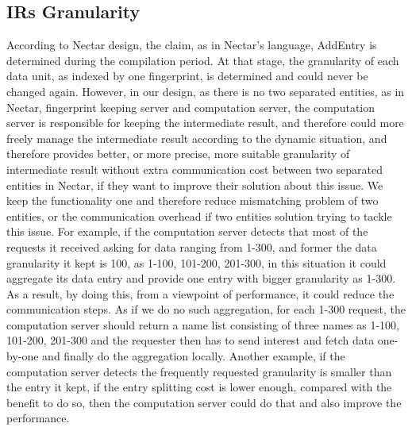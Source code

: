 \subsection{IRs Granularity}
According to Nectar design, the claim, as in Nectar’s language, AddEntry is determined during the compilation period. At that stage, the granularity of each data unit, as indexed by one fingerprint, is determined and could never be changed again. However, in our design, as there is no two separated entities, as in Nectar, fingerprint keeping server and computation server, the computation server is responsible for keeping the intermediate result, and therefore could more freely manage the intermediate result according to the dynamic situation, and therefore provides better, or more precise, more suitable granularity of intermediate result without extra communication cost between two separated entities in Nectar, if they want to improve their solution about this issue. We keep the functionality one and therefore reduce mismatching problem of two entities, or the communication overhead if two entities solution trying to tackle this issue. For example, if the computation server detects that most of the requests it received asking for data ranging from 1-300, and former the data granularity it kept is 100, as 1-100, 101-200, 201-300, in this situation it could aggregate its data entry and provide one entry with bigger granularity as 1-300. As a result, by doing this, from a viewpoint of performance, it could reduce the communication steps. As if we do no such aggregation, for each 1-300 request, the computation server should return a name list consisting of three names as 1-100, 101-200, 201-300 and the requester then has to send interest and fetch data one-by-one and finally do the aggregation locally. Another example, if the computation server detects the frequently requested granularity is smaller than the entry it kept, if the entry splitting cost is lower enough, compared with the benefit to do so, then the computation server could do that and also improve the performance.


